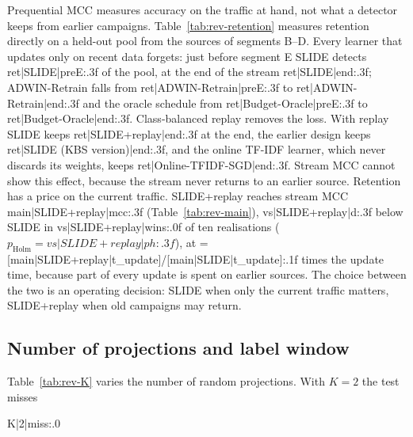 {{Prequential MCC measures accuracy on the traffic at hand, not what a detector keeps from earlier campaigns. Table~\ref{tab:rev-retention} measures retention directly on a held-out pool from the sources of segments B--D. Every learner that updates only on recent data forgets: just before segment E SLIDE detects {{ret|SLIDE|preE:.3f}} of the pool, at the end of the stream {{ret|SLIDE|end:.3f}}; ADWIN-Retrain falls from {{ret|ADWIN-Retrain|preE:.3f}} to {{ret|ADWIN-Retrain|end:.3f}} and the oracle schedule from {{ret|Budget-Oracle|preE:.3f}} to {{ret|Budget-Oracle|end:.3f}}. Class-balanced replay removes the loss. With replay SLIDE keeps {{ret|SLIDE+replay|end:.3f}} at the end, the earlier design keeps {{ret|SLIDE (KBS version)|end:.3f}}, and the online TF-IDF learner, which never discards its weights, keeps {{ret|Online-TFIDF-SGD|end:.3f}}. Stream MCC cannot show this effect, because the stream never returns to an earlier source. Retention has a price on the current traffic. SLIDE+replay reaches stream MCC {{main|SLIDE+replay|mcc:.3f}} (Table~\ref{tab:rev-main}), {{vs|SLIDE+replay|d:.3f}} below SLIDE in {{vs|SLIDE+replay|wins:.0f}} of ten realisations ($p_{\mathrm{Holm}}={{vs|SLIDE+replay|ph:.3f}}$), at {{=[main|SLIDE+replay|t_update]/[main|SLIDE|t_update]:.1f}} times the update time, because part of every update is spent on earlier sources. The choice between the two is an operating decision: SLIDE when only the current traffic matters, SLIDE+replay when old campaigns may return.



\subsection{Number of projections and label window}\label{sec:K}
Table~\ref{tab:rev-K} varies the number of random projections. With $K=2$ the test misses {{K|2|miss:.0%

}}}}

